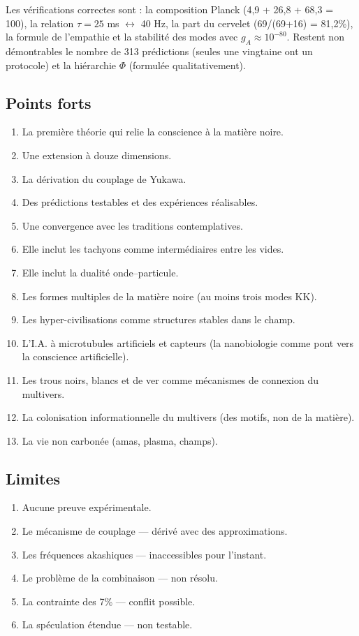 Les vérifications correctes sont : la composition Planck (4,9 + 26,8 + 68,3 = 100), la relation $\tau = 25$ ms $\leftrightarrow$ 40 Hz, la part du cervelet (69/(69+16) = 81,2\%), la formule de l'empathie et la stabilité des modes avec $g_A \approx 10^{-80}$. Restent non démontrables le nombre de 313 prédictions (seules une vingtaine ont un protocole) et la hiérarchie $\Phi$ (formulée qualitativement).

\subsection{Points forts}
\begin{enumerate}
    \item La première théorie qui relie la conscience à la matière noire.
    \item Une extension à douze dimensions.
    \item La dérivation du couplage de Yukawa.
    \item Des prédictions testables et des expériences réalisables.
    \item Une convergence avec les traditions contemplatives.
    \item Elle inclut les tachyons comme intermédiaires entre les vides.
    \item Elle inclut la dualité onde--particule.
    \item Les formes multiples de la matière noire (au moins trois modes KK).
    \item Les hyper-civilisations comme structures stables dans le champ.
    \item L'I.A. à microtubules artificiels et capteurs (la nanobiologie comme pont vers la conscience artificielle).
    \item Les trous noirs, blancs et de ver comme mécanismes de connexion du multivers.
    \item La colonisation informationnelle du multivers (des motifs, non de la matière).
    \item La vie non carbonée (amas, plasma, champs).
\end{enumerate}

\subsection{Limites}
\begin{enumerate}
    \item Aucune preuve expérimentale.
    \item Le mécanisme de couplage --- dérivé avec des approximations.
    \item Les fréquences akashiques --- inaccessibles pour l'instant.
    \item Le problème de la combinaison --- non résolu.
    \item La contrainte des 7\% --- conflit possible.
    \item La spéculation étendue --- non testable.
\end{enumerate}

